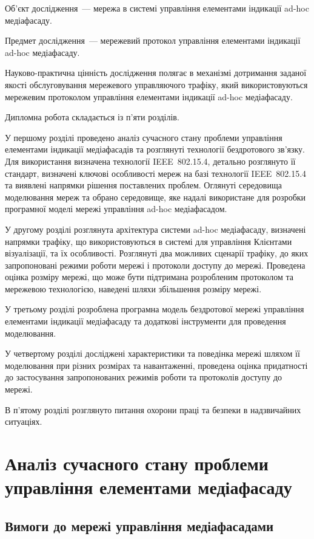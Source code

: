 \documentclass[a4paper,ukrainian,utf8,nocolumnsxix,floatsection,equationsection]{eskdtext}
\newcommand{\iee}[0]{IEEE~802.15.4\xspace}
\begin{document}
Об'єкт дослідження~--- мережа в системі управління елементами індикації ad-hoc медіафасаду.

Предмет дослідження~--- мережевий протокол управління елементами індикації ad-hoc медіафасаду.

Науково-практична цінність дослідження полягає в механізмі дотримання заданої якості обслуговування мережевого управляючого трафіку, який використовуються мережевим протоколом управління елементами індикації ad-hoc медіафасаду.

Дипломна робота складається із п'яти розділів.

У першому розділі проведено аналіз сучасного стану проблеми управління елементами індикації медіафасадів  та розглянуті технології бездротового зв'язку. Для використання визначена технології \iee, детально розглянуто її стандарт, визначені ключові особливості мереж на базі технології \iee та виявлені напрямки рішення поставлених проблем. Оглянуті середовища моделювання мереж та обрано середовище, яке надалі використане для розробки програмної моделі мережі управління ad-hoc медіафасадом.

У другому розділі розглянута архітектура системи ad-hoc медіафасаду, визначені напрямки трафіку, що використовуються в системі для управління Клієнтами візуалізації, та їх особливості. Розглянуті два можливих сценарії трафіку, до яких запропоновані режими роботи мережі і протоколи доступу до мережі. Проведена оцінка розміру мережі, що може бути підтримана розробленим протоколом та мережевою технологією, наведені шляхи збільшення розміру мережі.

У третьому розділі розроблена програмна модель бездротової мережі управління елементами індикації медіафасаду та додаткові інструменти для проведення моделювання.

У четвертому розділі досліджені характеристики та поведінка мережі шляхом її моделювання при різних розмірах та навантаженні, проведена оцінка придатності до застосування запропонованих режимів роботи та протоколів доступу до мережі.

В п'ятому розділі розглянуто питання охорони праці та безпеки в надзвичайних ситуаціях.

\section{Аналіз сучасного стану проблеми управління елементами медіафасаду}
\label{sec:1}

\subsection{Вимоги до мережі управління медіафасадами} 
\end{document}
